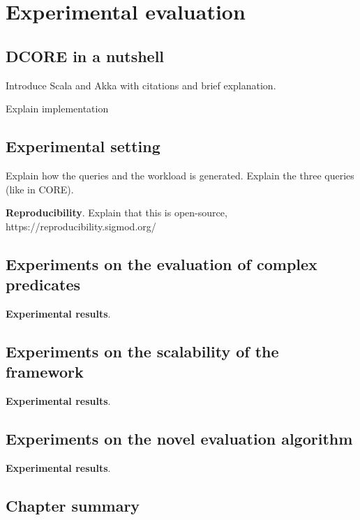 \chapter{Experimental evaluation}\label{chapter:experimental_evaluation}

\section{DCORE in a nutshell}\label{chapter:dcore}

Introduce Scala and Akka with citations and brief explanation.

Explain implementation

\section{Experimental setting}\label{sec:setup}


Explain how the queries and the workload is generated. Explain the three queries (like in CORE).

\textbf{Reproducibility}. Explain that this is open-source, https://reproducibility.sigmod.org/

\section{Experiments on the evaluation of complex predicates}\label{sec:predicates}

\textbf{Experimental results}.

\section{Experiments on the scalability of the framework}\label{sec:scalability}

\textbf{Experimental results}.

\section{Experiments on the novel evaluation algorithm}\label{sec:new-algorithm}

\textbf{Experimental results}.

\section{Chapter summary}
